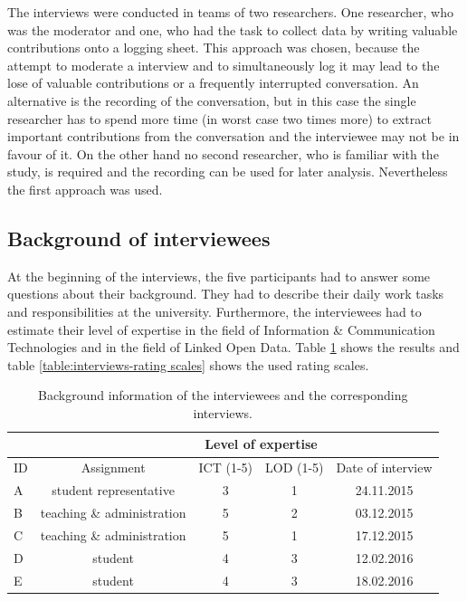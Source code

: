 \documentclass{article}
\begin{document}
The interviews were conducted in teams of two researchers. One researcher, who was the moderator and one, who had the task to collect data by writing valuable contributions onto a logging sheet. This approach was chosen, because the attempt to moderate a interview and to simultaneously log it may lead to the lose of valuable contributions or a frequently interrupted conversation. An alternative is the recording of the conversation, but in this case the single researcher has to spend more time (in worst case two times more) to extract important contributions from the conversation and the interviewee may not be in favour of it. On the other hand no second researcher, who is familiar with the study, is required and the recording can be used for later analysis. Nevertheless the first approach was used.

\subsection{Background of interviewees}
\label{lod-benefits-challenges:interviewees}
At the beginning of the interviews, the five participants had to answer some questions about their background. They had to describe their daily work tasks and responsibilities at the university. Furthermore, the interviewees had to estimate their level of expertise in the field of Information \& Communication Technologies and in the field of Linked Open Data. Table \ref{table:interviewee-background} shows the results and table \ref{table:interviews-rating scales} shows the used rating scales.\\

\begin{table}[h]
	\begin{tabular}{| l | c | c | c | c |}
 		\multicolumn{2}{c|}{} & \multicolumn{2}{c|}{Level of expertise} \\
 		\hline
		ID & Assignment & ICT (1-5) & LOD (1-5) & Date of interview \\
		\hline
		A  & student representative & 3 & 1 & 24.11.2015\\
		B & teaching \& administration & 5 & 2 & 03.12.2015\\
		C & teaching \& administration & 5 & 1 & 17.12.2015\\
		D & student & 4 & 3 & 12.02.2016\\
		E & student & 4 & 3 & 18.02.2016\\
		\hline
	\end{tabular}
	\caption{Background information of the interviewees and the corresponding interviews.}
	\label{table:interviewee-background}
\end{table}
\end{document}

